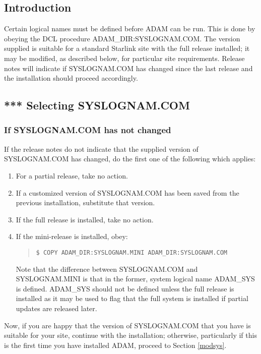 \subsection{Introduction}
Certain logical names must be defined before ADAM can be run.
This is done by obeying the DCL procedure ADAM\_DIR:\-SYS\-LOGNAM.\-COM.
The version supplied is suitable for a standard Starlink site
with the full release installed; it may be modified, as described below,
for particular site requirements.
Release notes will indicate if SYS\-LOG\-NAM\-.COM has changed since the last 
release and the installation should proceed accordingly.
\subsection{*** Selecting SYSLOGNAM.COM}
\subsubsection{If SYSLOGNAM.COM has not changed}
\label{nomodsys}
If the release notes do not indicate that the supplied version of 
SYS\-LOGNAM\-.COM has changed, do the first one of the following which applies:
\begin{enumerate}
\item For a partial release, take no action.
\item If a customized version of SYSLOGNAM.COM has been saved from the previous 
installation, substitute that version.
\item If the full release is installed, take no action.
\item If the mini-release is installed, obey:
\small \begin{quote}
\begin{verbatim}
$ COPY ADAM_DIR:SYSLOGNAM.MINI ADAM_DIR:SYSLOGNAM.COM
\end{verbatim}
\end{quote} \normalsize
Note that the difference between SYSLOGNAM.COM and SYSLOGNAM.MINI is that
in the former, system logical name ADAM\_SYS is defined.
ADAM\_SYS should not be defined unless the full release is installed as it may 
be used to flag that the full system is installed if partial updates are 
released later.
\end{enumerate}
Now, if you are happy that the version of SYS\-LOGNAM\-.COM that you have is
suitable for your site, continue with the installation; otherwise, particularly
if this is the first time you have installed ADAM, proceed to Section 
\ref{modsys}.

